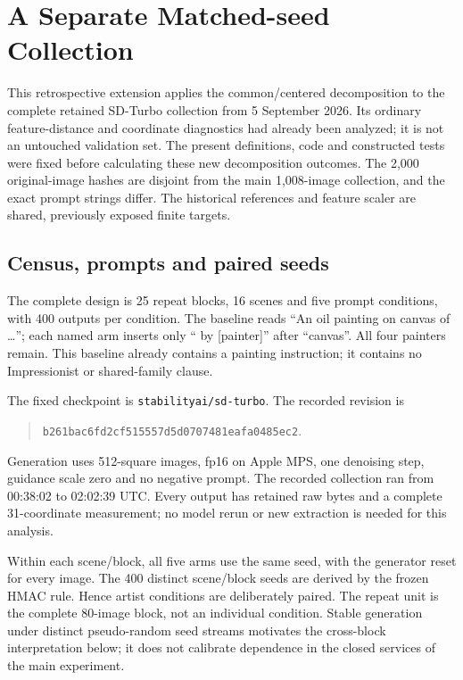 \section{A Separate Matched-seed Collection}\label{app:cross-cohort}
This retrospective extension applies the common/centered decomposition to the
complete retained SD-Turbo collection from 5 September 2026. Its ordinary
feature-distance and coordinate diagnostics had already been analyzed; it is
not an untouched validation set. The present definitions, code and constructed
tests were fixed before calculating these new decomposition outcomes. The
2,000 original-image hashes are disjoint from the main 1,008-image collection,
and the exact prompt strings differ. The historical references and feature
scaler are shared, previously exposed finite targets.

\subsection{Census, prompts and paired seeds}
The complete design is 25 repeat blocks, 16 scenes and five prompt conditions,
with 400 outputs per condition. The baseline reads ``An oil painting on canvas
of \ldots''; each named arm inserts only `` by [painter]'' after ``canvas''.
All four painters remain. This baseline already contains a painting
instruction; it contains no Impressionist or shared-family clause.

The fixed checkpoint is \texttt{stabilityai/sd-turbo}. The recorded revision is
\begin{quote}\texttt{b261bac6fd2cf515557d5d0707481eafa0485ec2}.\end{quote}
Generation uses 512-square images, fp16 on Apple MPS, one denoising step,
guidance scale zero and no negative prompt.
The recorded collection ran from 00:38:02 to 02:02:39 UTC. Every output
has retained raw bytes and a complete 31-coordinate measurement; no model
rerun or new extraction is needed for this analysis.

Within each scene/block, all five arms use the same seed, with the generator
reset for every image. The 400 distinct scene/block seeds are derived by the
frozen HMAC rule. Hence artist conditions are deliberately paired. The repeat
unit is the complete 80-image block, not an individual condition. Stable
generation under distinct pseudo-random seed streams motivates the
cross-block interpretation below; it does not calibrate dependence in the
closed services of the main experiment.

